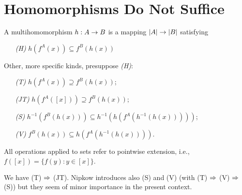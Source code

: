 \section{Homomorphisms Do Not Suffice}

\begin{DEFINITION}{}\label{de:homs}
A multihomomorphism $h:A\rightarrow B$ is a mapping $|A| \rightarrow |B|$
satisfying
\begin{itemize}\MyLPar
\item[{\em (H)}] $h(f^A(x))\subseteq f^B(h(x))$
\end{itemize}
\noindent
Other, more specific kinds, presuppose {\em (H)}:
\begin{itemize}\MyLPar
\item[{\em (T)}] $h(f^A(x))\supseteq f^B(h(x))$;
\item[{\em (JT)}] $h(f^A([x]))\supseteq f^B(h(x))$;
\item[{\em (S)}] $h^{-1}(f^B(h(x))) \subseteq h^{-1}(h(f^A(h^{-1}(h(x)))))$;
\item[{\em (V)}] $f^B(h(x)) \subseteq h(f^A(h^{-1}(h(x))))$.
\end{itemize}
\end{DEFINITION}
\noindent
All operations applied to sets refer to pointwise extension, i.e.,
$f([x])=\{f(y):y\in[x]\}$.

We have (T) $\mathrel\Rightarrow$ (JT). Nipkow \cite{Nip} introduces also (S) and
(V) (with (T) $\mathrel\Rightarrow$ (V) $\mathrel\Rightarrow$ (S)) but they seem of minor importance in
the present context. 

